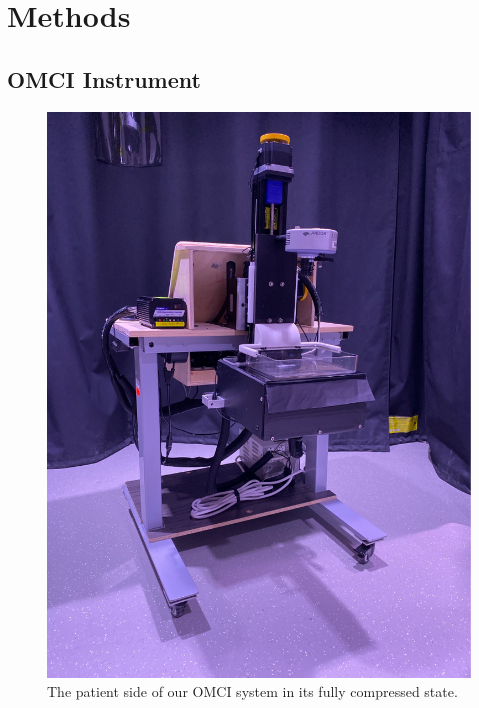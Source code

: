 \section{Methods}
\label{chap:omci:methods}

\subsection{OMCI Instrument}
\begin{figure}
    \begin{center}
        \includegraphics[width=.6\textwidth]{fig/omci/OMCIoverview.pdf}
    \end{center}
    \caption{The patient side of our OMCI system in its fully compressed state.} 
    \label{fig:OMCISystem}
\end{figure} 

